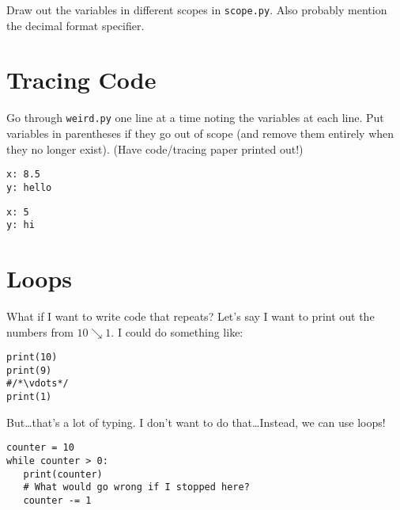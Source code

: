 \documentclass[12pt]{article}
\begin{document}
Draw out the variables in different scopes in \lstinline{scope.py}.  Also
probably mention the decimal format specifier.

\section{Tracing Code}

Go through \lstinline{weird.py} one line at a time noting the variables at each
line.  Put variables in parentheses if they go out of scope (and remove them
entirely when they no longer exist).  (Have code/tracing paper printed out!)

\begin{lstlisting}
x: 8.5
y: hello
\end{lstlisting}

\begin{lstlisting}
x: 5
y: hi
\end{lstlisting}

\section{Loops}

What if I want to write code that repeats?  Let's say I want to print out the
numbers from $10 \searrow 1$.  I could do something like:

\begin{lstlisting}
print(10)
print(9)
#/*\vdots*/
print(1)
\end{lstlisting}

\noindent
But\dots that's a lot of typing.  I don't want to do that\dots  Instead, we can
use loops!

\begin{lstlisting}
counter = 10
while counter > 0:
   print(counter)
   # What would go wrong if I stopped here?
   counter -= 1
\end{lstlisting}
\end{document}

